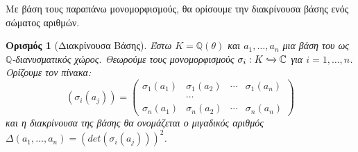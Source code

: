 \documentclass[oneside,a4paper]{article}
\newtheorem*{defn}{Ορισμός}
\newcommand{\Q}{\mathbb{Q}}
\begin{document}
\noindent Με βάση τους παραπάνω μονομορφισμούς, θα ορίσουμε την διακρίνουσα βάσης ενός σώματος αριθμών.

\begin{defn}[Διακρίνουσα Βάσης]
	Έστω $K=\Q(\theta)$ και $a_1,\ldots,a_n$ μια βάση του ως $\Q$-διανυσματικός χώρος. Θεωρούμε τους μονομορφισμούς $\sigma_i : K \xhookrightarrow{} \mathbb{C}$ για $i=1,\ldots,n$. Ορίζουμε τον πίνακα:
	$$(\sigma_i(a_j)) = \begin{pmatrix}
		\sigma_1 (a_1) & \sigma_1 (a_2) & \cdots & \sigma_1 (a_n) \\
		 & \cdots & & \\
		 \sigma_n (a_1) & \sigma_n(a_2) & \cdots & \sigma_n(a_n)
	\end{pmatrix}$$ και η διακρίνουσα της βάσης θα ονομάζεται ο μιγαδικός αριθμός $\Delta(a_1,\ldots,a_n) = (det(\sigma_i(a_j)))^2$.
\end{defn}
\end{document}
